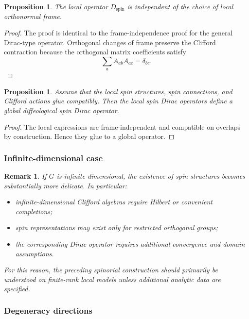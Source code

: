 \documentclass[11pt]{amsart}
\newtheorem{proposition}[theorem]{Proposition}
\newtheorem{remark}[theorem]{Remark}
\begin{document}
\begin{proposition}
The local operator \(D_{\mathrm{spin}}\) is independent of the choice of local
orthonormal frame.
\end{proposition}

\begin{proof}
The proof is identical to the frame-independence proof for the general
Dirac-type operator. Orthogonal changes of frame preserve the Clifford
contraction because the orthogonal matrix coefficients satisfy
\[
\sum_a A_{ab}A_{ac}
=
\delta_{bc}.
\]
\end{proof}

\begin{proposition}
Assume that the local spin structures, spin connections, and Clifford actions
glue compatibly. Then the local spin Dirac operators define a global
diffeological spin Dirac operator.
\end{proposition}

\begin{proof}
The local expressions are frame-independent and compatible on overlaps by
construction. Hence they glue to a global operator.
\end{proof}

\subsubsection{Infinite-dimensional case}

\begin{remark}
If \(G\) is infinite-dimensional, the existence of spin structures becomes
substantially more delicate. In particular:
\begin{itemize}
\item infinite-dimensional Clifford algebras require Hilbert or convenient
completions;
\item spin representations may exist only for restricted orthogonal groups;
\item the corresponding Dirac operator requires additional convergence and
domain assumptions.
\end{itemize}
For this reason, the preceding spinorial construction should primarily be
understood on finite-rank local models unless additional analytic data are
specified.
\end{remark}

\subsubsection{Degeneracy directions}
\end{document}
